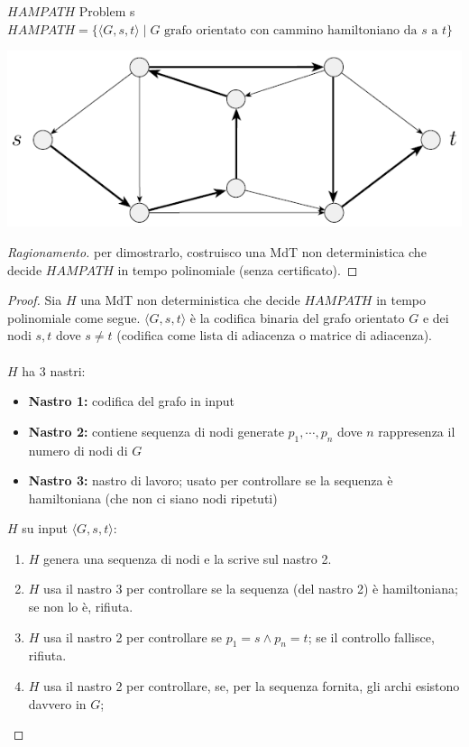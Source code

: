 \documentclass{article}  %
\theoremstyle{definition}
\newenvironment{ragionamento}[1][]
  {\begin{proof}[Ragionamento#1]\renewcommand{\qedsymbol}{}\normalfont}
  {\end{proof}}
\begin{document}
\begin{theorem}{$HAMPATH$ Problem}
	s\footnotesize
	$HAMPATH = \{\langle G,s,t \rangle \mid G \text{ grafo orientato con cammino hamiltoniano da } s \text{ a } t\}$
	\begin{center}
		\includegraphics[width=0.7\linewidth]{hampath-problem.png}
	\end{center}
	\begin{ragionamento}
		per dimostrarlo, costruisco una MdT non deterministica che decide $HAMPATH$ in tempo polinomiale (senza certificato).
	\end{ragionamento}
	\begin{proof}
		Sia $H$ una MdT non deterministica che decide $HAMPATH$ in tempo polinomiale come segue. $\langle G,s,t \rangle$ è la codifica binaria
		del grafo orientato $G$ e dei nodi $s,t$ dove $s \neq t$ (codifica come lista di adiacenza o matrice di adiacenza). \\ \\
		$H$ ha 3 nastri:
		\begin{itemize}
			\item \textbf{Nastro 1:} codifica del grafo in input
			\item \textbf{Nastro 2:} contiene sequenza di nodi generate $p_1, \cdots, p_n$ dove $n$ rappresenza il numero di nodi di $G$
			\item \textbf{Nastro 3:} nastro di lavoro; usato per controllare se la sequenza è hamiltoniana (che non ci siano nodi ripetuti)
		\end{itemize}
		$H$ su input $\langle G,s,t \rangle$:
		\begin{enumerate}
			\item $H$ genera una sequenza di nodi e la scrive sul nastro 2.
			\item $H$ usa il nastro 3 per controllare se la sequenza (del nastro 2) è hamiltoniana; se non lo è, rifiuta.
			\item $H$ usa il nastro 2 per controllare se $p_1=s \land p_n=t$; se il controllo fallisce, rifiuta.
			\item $H$ usa il nastro 2 per controllare, se, per la sequenza fornita, gli archi esistono davvero in $G$;

\end{enumerate}
\end{proof}
\end{theorem}
\end{document}
